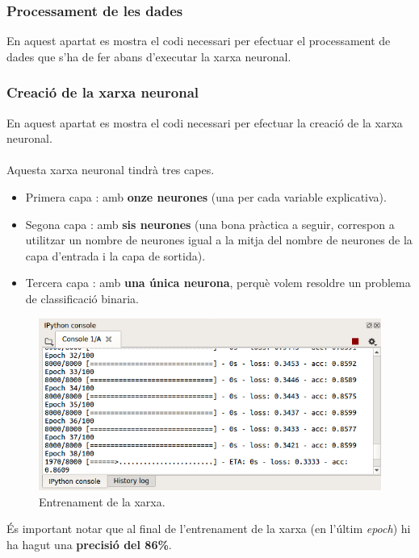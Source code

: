 \documentclass[12pt]{article}
\begin{document}
\subsubsection{Processament de les dades}
En aquest apartat es mostra el codi necessari per efectuar el processament de dades que s'ha de fer abans d'executar la xarxa neuronal.


\subsubsection{Creació de la xarxa neuronal}
En aquest apartat es mostra el codi necessari per efectuar la creació de la xarxa neuronal.
\\\\Aquesta xarxa neuronal tindrà tres capes.
\begin{itemize}
	\item Primera capa : amb \textbf{onze neurones} (una per cada variable explicativa).
	\item Segona capa : amb \textbf{sis neurones} (una bona pràctica a seguir, correspon a utilitzar un nombre de neurones igual a la mitja del nombre de neurones de la capa d'entrada i la capa de sortida).
	\item Tercera capa : amb \textbf{una única neurona}, perquè volem resoldre un problema de classificació binaria.
\end{itemize}

\begin{figure}[h!]
	\centering
	\includegraphics[scale=0.4]{imatges/python/entrenament.png}
	\caption{Entrenament de la xarxa.}
\end{figure}
És important notar que al final de l'entrenament de la xarxa (en l'últim \textit{epoch}) hi ha hagut una \textbf{precisió del 86\%}.
\end{document}
